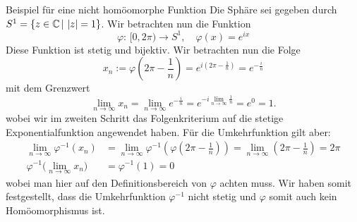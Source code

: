 \begin{Beispiel}
    {Beispiel für eine nicht homöomorphe Funktion}
    Die Sphäre sei gegeben durch $S^1=\left\{z\in\mathbb{C}\,|\,\left|{z}\right|=1\right\}$. Wir betrachten nun die Funktion 
    \begin{equation*}
        \varphi:\,[0,2\pi)\rightarrow S^1, \quad \varphi(x)=e^{ix}
    \end{equation*}
    Diese Funktion ist stetig und bijektiv. Wir betrachten nun die Folge
    \begin{equation*}
        x_n := \varphi(2\pi-\frac{1}{n})=e^{i(2\pi-\frac{1}{n})}=e^{-\frac{i}{n}}
    \end{equation*}
    mit dem Grenzwert
    \begin{equation*}
        \lim_{n\rightarrow\infty} x_n = \lim_{n\rightarrow\infty} e^{-\frac{i}{n}} = e^{-i\lim_{n\rightarrow\infty} \frac{1}{n}} = e^{0} = 1.
    \end{equation*}
    wobei wir im zweiten Schritt das Folgenkriterium auf die stetige Exponentialfunktion angewendet haben. Für die Umkehrfunktion gilt aber:
    \begin{align*}
        \lim_{n\rightarrow\infty}\varphi^{-1}(x_n) &= \lim_{n\rightarrow\infty}\varphi^{-1}(\varphi(2\pi-\frac{1}{n}))=\lim_{n\rightarrow\infty}(2\pi-\frac{1}{n})=2\pi \\
        \varphi^{-1}\Big( \lim_{n\rightarrow\infty} x_n \Big) &= \varphi^{-1}(1) = 0
    \end{align*}
    wobei man hier auf den Definitionsbereich von $\varphi$ achten muss. Wir haben somit festgestellt, dass die Umkehrfunktion $\varphi^{-1}$ nicht stetig und $\varphi$ somit auch kein Homöomorphismus ist.
\end{Beispiel} 
    
